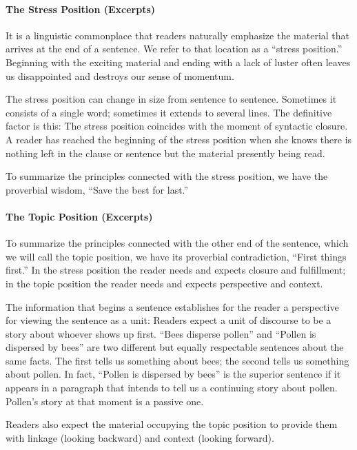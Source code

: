 \paragraph{The Stress Position (Excerpts)}

It is a linguistic commonplace that readers naturally emphasize the material that arrives at the end of a sentence. We refer to that location as a “stress position.”
Beginning with the exciting material and ending with a lack of luster often leaves us disappointed and destroys our sense of momentum.

The stress position can change in size from sentence to sentence. Sometimes it consists of a single word; sometimes it extends to several lines. The definitive factor is this: The stress position coincides with the moment of syntactic closure. A reader has reached the beginning of the stress position when she knows there is nothing left in the clause or sentence but the material presently being read.

To summarize the principles connected with the stress position, we have the proverbial wisdom, “Save the best for last.”

\paragraph{The Topic Position (Excerpts)}

To summarize the principles connected with the other end of the sentence, which we will call the topic position, we have its proverbial contradiction, “First things first.”
In the stress position the reader needs and expects closure and fulfillment; in the topic position the reader needs and expects perspective and context.

The information that begins a sentence establishes for the reader a perspective for viewing the sentence as a unit: Readers expect a unit of discourse to be a story about whoever shows up first. “Bees disperse pollen” and “Pollen is dispersed by bees” are two different but equally respectable sentences about the same facts. The first tells us something about bees; the second tells us something about pollen. In fact, “Pollen is dispersed by bees” is the superior sentence if it appears in a paragraph that intends to tell us a continuing story about pollen. Pollen’s story at that moment is a passive one.

Readers also expect the material occupying the topic position to provide them with linkage (looking backward) and context (looking forward).

